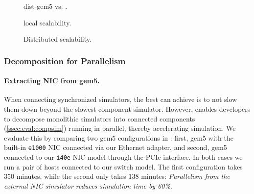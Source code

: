 \begin{figure}%
\centering%
\begin{minipage}{0.3\textwidth}%
\centering%
%
\caption{dist-gem5 vs. \sysname.}%
\label{fig:dist-gem}%
\end{minipage}%
\hfill%
\hfill%
\begin{minipage}{0.3\textwidth}%
\centering%
%
\caption{\sysname local scalability.}%
\label{fig:machines-scale}%
\end{minipage}%
\hfill%
\begin{minipage}{0.3\textwidth}%
\centering%
%
\caption{Distributed scalability.}%
\label{fig:large-scale}%
\end{minipage}%
%
\end{figure}


\subsubsection{Decomposition for Parallelism}
\label{ssec:eval:decomp}
%
\paragraph{Extracting NIC from gem5.}
When connecting synchronized simulators, the best \sysname can achieve
is to not slow them down beyond the slowest component simulator.
%
However, \sysname enables developers to decompose monolithic
simulators into connected components (\autoref{ssec:eval:compsim})
running in parallel, thereby accelerating simulation.
%
We evaluate this by comparing two gem5 configurations in \sysname:
first, gem5 with the built-in \texttt{e1000} NIC connected via our
Ethernet adapter, and second, gem5 connected to our \texttt{i40e} NIC
model through the PCIe interface.
%
In both cases we run a pair of hosts connected to our switch model.
%
The first configuration takes 350 minutes, while the second only takes 138
minutes: \emph{Parallelism from the external NIC simulator reduces simulation
time by 60\%}.

